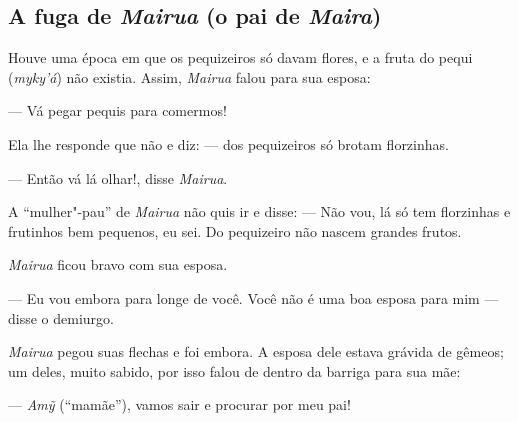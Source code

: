 \subsection{A fuga de \emph{Mairua} (o pai de \emph{Maira})}

\forceindent Houve uma época em que os pequizeiros só davam flores, e a fruta do
pequi (\emph{myky'á}) não existia. Assim, \emph{Mairua} falou para sua
esposa:

--- Vá pegar pequis para comermos!

Ela lhe responde que não e diz: --- dos pequizeiros só brotam florzinhas.

--- Então vá lá olhar!, disse \emph{Mairua}.

A ``mulher"-pau'' de \emph{Mairua} não quis ir e disse: --- Não vou, lá só
tem florzinhas e frutinhos bem pequenos, eu sei. Do pequizeiro não
nascem grandes frutos.

\emph{Mairua} ficou bravo com sua esposa.

--- Eu vou embora para longe de você. Você não é uma boa esposa para mim ---
disse o demiurgo.

\emph{Mairua} pegou suas flechas e foi embora. A esposa dele estava
grávida de gêmeos; um deles, muito sabido, por isso falou de dentro da
barriga para sua mãe:

--- \emph{Amỹ} (``mamãe''), vamos sair e procurar por meu pai!

